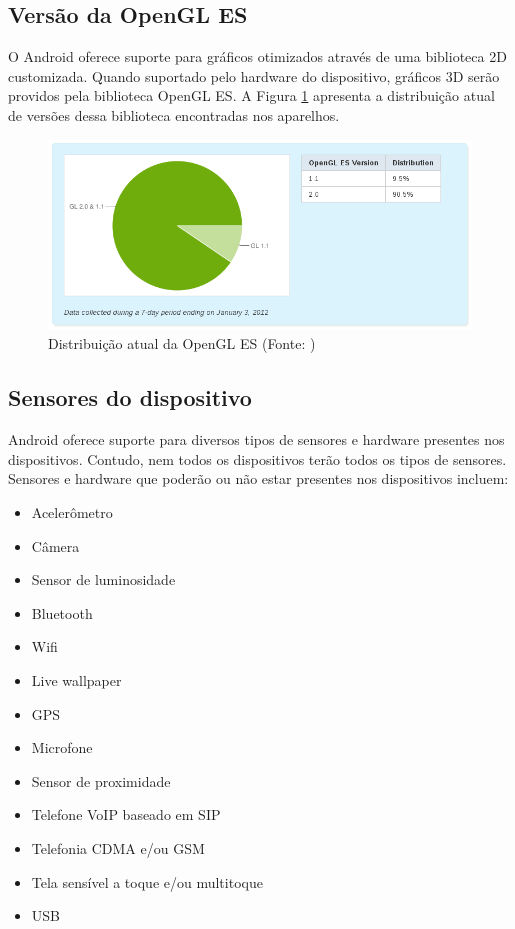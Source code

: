 \subsection{Versão da OpenGL ES}

O Android oferece suporte para gráficos otimizados através de uma biblioteca 2D 
customizada. Quando suportado pelo hardware do dispositivo, gráficos 3D serão 
providos pela biblioteca OpenGL ES. A Figura \ref{distribuicao_opengl} apresenta 
a distribuição atual de versões dessa biblioteca encontradas nos aparelhos.

\begin{figure}[h]
    \centering
    \includegraphics[width=15cm]{img/opengl}
    \caption{Distribuição atual da OpenGL ES (Fonte: \cite{opengl_versions})}
    \label{distribuicao_opengl}
\end{figure}


\subsection{Sensores do dispositivo}

Android oferece suporte para diversos tipos de sensores e hardware presentes nos 
dispositivos. Contudo, nem todos os dispositivos terão todos os tipos de sensores.
Sensores e hardware que poderão ou não estar presentes nos dispositivos incluem:
\begin{itemize}
    \item Acelerômetro
    \item Câmera
    \item Sensor de luminosidade
    \item Bluetooth
    \item Wifi
    \item Live wallpaper
    \item GPS
    \item Microfone
    \item Sensor de proximidade
    \item Telefone VoIP baseado em SIP
    \item Telefonia CDMA e/ou GSM
    \item Tela sensível a toque e/ou multitoque
    \item USB
\end{itemize}



